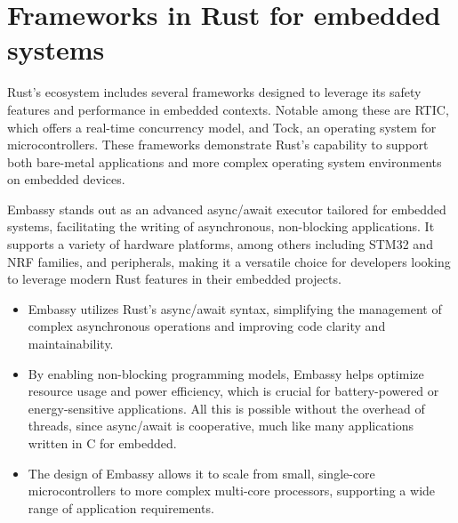 \section{Frameworks in Rust for embedded systems}
Rust's ecosystem includes several frameworks designed to leverage its safety features and performance in embedded contexts. Notable among these are RTIC, which offers a real-time concurrency model, and Tock, an operating system for microcontrollers. These frameworks demonstrate Rust's capability to support both bare-metal applications and more complex operating system environments on embedded devices.

Embassy stands out as an advanced async/await executor tailored for embedded systems, facilitating the writing of asynchronous, non-blocking applications. It supports a variety of hardware platforms, among others including STM32 and NRF families, and peripherals, making it a versatile choice for developers looking to leverage modern Rust features in their embedded projects.

\begin{itemize}
    \item Embassy utilizes Rust's async/await syntax, simplifying the management of complex asynchronous operations and improving code clarity and maintainability.
    \item By enabling non-blocking programming models, Embassy helps optimize resource usage and power efficiency, which is crucial for battery-powered or energy-sensitive applications. All this is possible without the overhead of threads, since async/await is cooperative, much like many applications written in C for embedded.
    \item The design of Embassy allows it to scale from small, single-core microcontrollers to more complex multi-core processors, supporting a wide range of application requirements.
\end{itemize}


